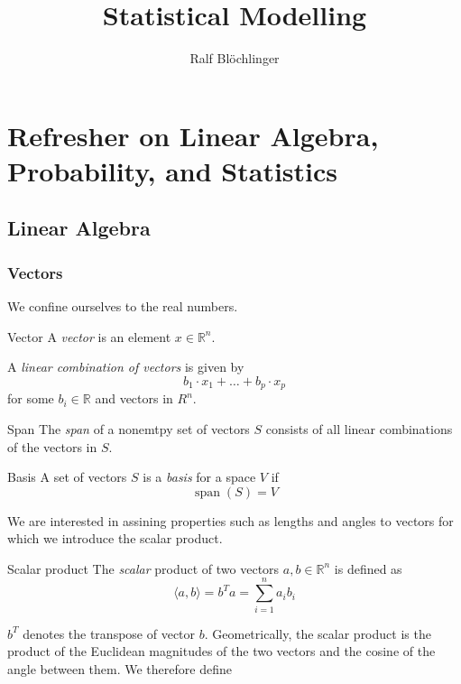 \documentclass[11pt, %
	oneside, %
	english, %
	onehalfspacing, %
	]{article} %
\title{\Huge{Statistical Modelling}}
\author{Ralf Blöchlinger}
\date{}
\numberwithin{equation}{section}
\begin{document}
\maketitle

\tableofcontents

\newpage




\section{Refresher on Linear Algebra, Probability, and Statistics}\label{ch:refresh}

\subsection{Linear Algebra}

\subsubsection{Vectors}

We confine ourselves to the real numbers.

\begin{definition}{Vector}{}
    A \emph{vector} is an element $x \in \mathbb{R}^n$.
\end{definition}

A \emph{linear combination of vectors} is given by
\begin{equation*}
    b_1 \cdot x_1 + \ldots + b_p \cdot x_p
\end{equation*}
for some $b_i \in \mathbb{R}$ and vectors in $R^n$.

\begin{definition}{Span}{}
    The \emph{span} of a nonemtpy set of vectors $S$ consists of all linear combinations of the vectors in $S$.
\end{definition}

\begin{definition}{Basis}{}
    A set of vectors $S$ is a \emph{basis} for a space $V$ if
    \begin{equation*}
        \operatorname{span}(S) = V
    \end{equation*}
\end{definition}

We are interested in assining properties such as lengths and angles to vectors for which we introduce the scalar product.

\begin{definition}{Scalar product}{}
    The \emph{scalar} product of two vectors $a,b \in \mathbb{R}^n$ is defined as
    \begin{equation*}
        \langle a,b\rangle = b^T a = \sum_{i=1}^n a_i b_i
    \end{equation*}
\end{definition}
$b^T$ denotes the transpose of vector $b$. Geometrically, the scalar product is the product of the Euclidean magnitudes of the two vectors and the cosine of the angle between them. We therefore define
\end{document}
